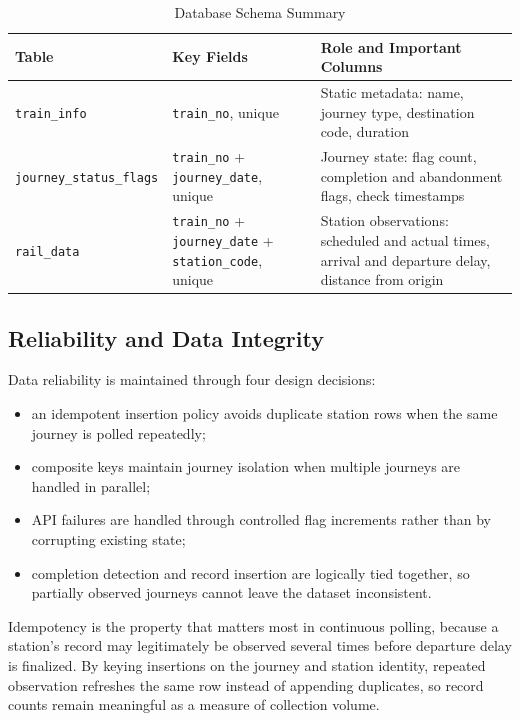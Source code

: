 \documentclass[conference]{IEEEtran}
\begin{document}
\begin{table}[!t]
\centering
\caption{Database Schema Summary}
\label{tab:db_schema}
\footnotesize
\setlength{\tabcolsep}{4pt}
\begin{tabular}{@{}p{}p{}p{}@{}}
\toprule
Table & Key Fields & Role and Important Columns \\
\midrule
\texttt{train\_}\allowbreak\texttt{info} & \texttt{train\_}\allowbreak\texttt{no}, unique & Static metadata: name, journey type, destination code, duration \\
\addlinespace
\texttt{journey\_}\allowbreak\texttt{status\_}\allowbreak\texttt{flags} & \texttt{train\_}\allowbreak\texttt{no} + \texttt{journey\_}\allowbreak\texttt{date}, unique & Journey state: flag count, completion and abandonment flags, check timestamps \\
\addlinespace
\texttt{rail\_data} & \texttt{train\_}\allowbreak\texttt{no} + \texttt{journey\_}\allowbreak\texttt{date} + \texttt{station\_}\allowbreak\texttt{code}, unique & Station observations: scheduled and actual times, arrival and departure delay, distance from origin \\
\bottomrule
\end{tabular}
\end{table}

\subsection{Reliability and Data Integrity}
Data reliability is maintained through four design decisions:
\begin{itemize}
    \item an idempotent insertion policy avoids duplicate station rows when the same journey is polled repeatedly;
    \item composite keys maintain journey isolation when multiple journeys are handled in parallel;
    \item API failures are handled through controlled flag increments rather than by corrupting existing state;
    \item completion detection and record insertion are logically tied together, so partially observed journeys cannot leave the dataset inconsistent.
\end{itemize}
Idempotency is the property that matters most in continuous polling, because a station's record may legitimately be observed several times before departure delay is finalized. By keying insertions on the journey and station identity, repeated observation refreshes the same row instead of appending duplicates, so record counts remain meaningful as a measure of collection volume.
\end{document}
